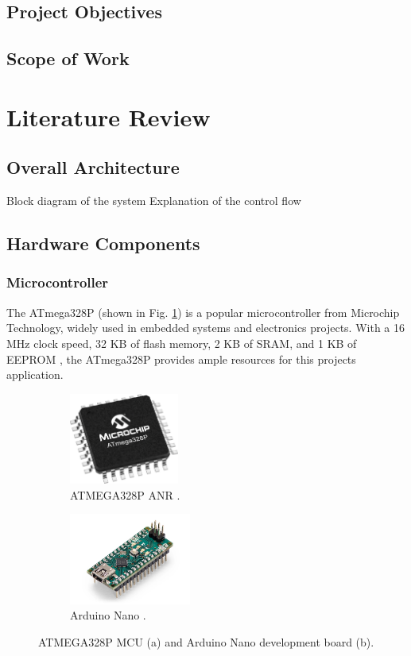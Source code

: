 \documentclass{article}
\begin{document}
\subsection{Project Objectives}

\subsection{Scope of Work}


\section{Literature Review}
\subsection{Overall Architecture}
Block diagram of the system
Explanation of the control flow


\subsection{Hardware Components}
\subsubsection{Microcontroller}
The ATmega328P (shown in Fig. \ref{fig:ATmega328p}) is a popular microcontroller from Microchip Technology, widely used in embedded systems and electronics projects. With a 16 MHz clock speed, 32 KB of flash memory, 2 KB of SRAM, and 1 KB of EEPROM \cite{atmega_microchip}, the ATmega328P provides ample resources for this projects application. 

\begin{figure}[h]
	\begin{subfigure}{0.5\textwidth}
	    \centering
		\includegraphics[height=3cm]{assets/ATmega328p.png}
		\caption{ATMEGA328P ANR \cite{atmega_microchip}.}
		\label{fig:ATmega328p}
	\end{subfigure}
	\begin{subfigure}{0.5\textwidth}
    	\centering
		\includegraphics[height=3cm]{assets/arduino_nano.jpg}
		\caption{Arduino Nano \cite{arduino_nano}.}
		\label{fig:arduino_nano}
	\end{subfigure}
	 \caption{ATMEGA328P MCU (a) and Arduino Nano development board (b).} %
	\label{fig:ATmega328p_and_arduino_nano}
\end{figure}
\end{document}
